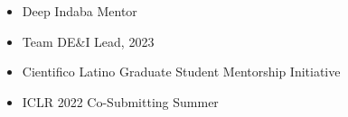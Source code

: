 \documentclass[margin]{res}
\begin{document}
\begin{resume}
\begin{itemize}
 \item Deep Indaba Mentor
 \item Team DE\&I Lead, 2023 
 \item Cientifico Latino Graduate Student Mentorship Initiative
 \item ICLR 2022 Co-Submitting Summer
\end{itemize}

\end{resume}
\end{document}
